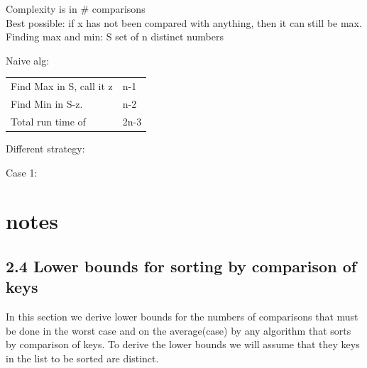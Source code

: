 \documentclass[a4paper,10pt,titlepage]{report}
\begin{document}
Complexity is in \# comparisons\\

Best possible: if x has not been compared with anything, then it can still be max.\\

Finding max and min: S set of n distinct numbers\\
\vspace{5mm}

Naive alg:\\
\begin{tabular}{ll}
Find Max in S, call it z & n-1\\
Find Min in S-z. & n-2\\
Total run time of & 2n-3
\end{tabular}

Different strategy:

Case 1:


\chapter{notes}

\section{2.4 Lower bounds for sorting by comparison of keys}
In this section we derive lower bounds for the numbers of comparisons that must be done in the worst case and on the average(case) by any algorithm that sorts by comparison of keys. To derive the lower bounds we will assume that they keys in the list to be sorted are distinct.
\end{document}

